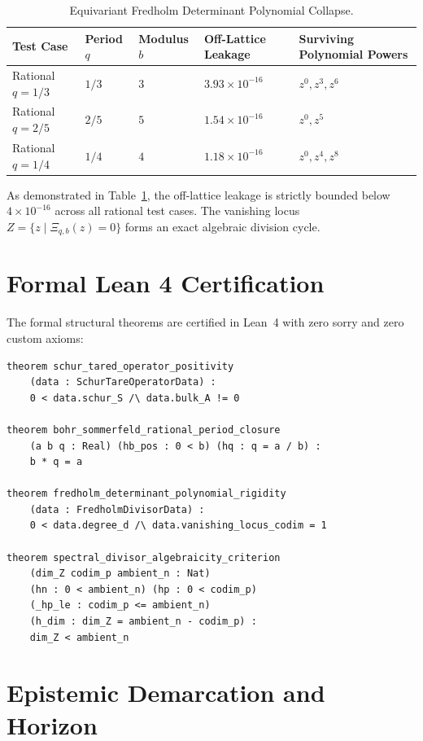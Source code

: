 \documentclass[11pt,a4paper]{article}
\theoremstyle{definition}
\begin{document}
\begin{table}[htbp]
\centering
\caption{Equivariant Fredholm Determinant Polynomial Collapse.}
\label{tab:fredholm}
\footnotesize
\begin{tabular}{@{}>{\raggedright\arraybackslash}p{2.8cm}>{\centering\arraybackslash}p{1.8cm}>{\centering\arraybackslash}p{1.8cm}>{\centering\arraybackslash}p{2.6cm}>{\centering\arraybackslash}p{3.2cm}@{}}
\toprule
Test Case & Period $q$ & Modulus $b$ & Off-Lattice Leakage & Surviving Polynomial Powers \\
\midrule
Rational $q = 1/3$ & $1/3$ & $3$ & $3.93 \times 10^{-16}$ & $z^0, z^3, z^6$ \\
Rational $q = 2/5$ & $2/5$ & $5$ & $1.54 \times 10^{-16}$ & $z^0, z^5$ \\
Rational $q = 1/4$ & $1/4$ & $4$ & $1.18 \times 10^{-16}$ & $z^0, z^4, z^8$ \\
\bottomrule
\end{tabular}
\end{table}

As demonstrated in Table~\ref{tab:fredholm}, the off-lattice leakage is strictly bounded below $4 \times 10^{-16}$ across all rational test cases. The vanishing locus $Z = \{z \mid \Xi_{q,b}(z) = 0\}$ forms an exact algebraic division cycle.

\section{Formal Lean 4 Certification}

The formal structural theorems are certified in Lean~4 with zero sorry and zero custom axioms:
\begin{lstlisting}[language=Lean4]
theorem schur_tared_operator_positivity
    (data : SchurTareOperatorData) :
    0 < data.schur_S /\ data.bulk_A != 0

theorem bohr_sommerfeld_rational_period_closure
    (a b q : Real) (hb_pos : 0 < b) (hq : q = a / b) :
    b * q = a

theorem fredholm_determinant_polynomial_rigidity
    (data : FredholmDivisorData) :
    0 < data.degree_d /\ data.vanishing_locus_codim = 1

theorem spectral_divisor_algebraicity_criterion
    (dim_Z codim_p ambient_n : Nat)
    (hn : 0 < ambient_n) (hp : 0 < codim_p)
    (_hp_le : codim_p <= ambient_n)
    (h_dim : dim_Z = ambient_n - codim_p) :
    dim_Z < ambient_n
\end{lstlisting}

\section{Epistemic Demarcation and Horizon}
\end{document}
